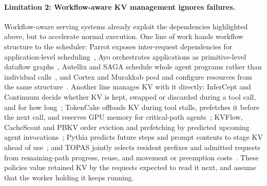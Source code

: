 \paragraph{Limitation 2: Workflow-aware KV management ignores failures.}
Workflow-aware serving systems already exploit the dependencies
highlighted above, but to accelerate normal execution. One line of work
hands workflow structure to the scheduler: Parrot exposes inter-request
dependencies for application-level scheduling~\cite{lin2024parrot}, Ayo
orchestrates applications as primitive-level dataflow
graphs~\cite{tan2025ayo}, Autellix and SAGA schedule whole agent programs
rather than individual calls~\cite{luo2025autellix,guo2026saga}, and
Cortex and Murakkab pool and configure resources from the same
structure~\cite{pagonas2025cortex,chaudhry2026murakkab}. Another line
manages KV with it directly: InferCept and Continuum decide whether KV is
kept, swapped or discarded during a tool call, and for how
long~\cite{abhyankar2024infercept,li2025continuum}; TokenCake offloads KV
during tool stalls, prefetches it before the next call, and reserves GPU
memory for critical-path agents~\cite{bian2025tokencake}; KVFlow,
CacheScout and PBKV order eviction and prefetching by predicted upcoming
agent invocations~\cite{pan2025kvflow,zhang2026cachescout,zheng2026pbkv};
Pythia predicts future steps and prompt contents to stage KV ahead of
use~\cite{yu2026pythia}; and TOPAS jointly selects resident prefixes and
admitted requests from remaining-path progress, reuse, and movement or
preemption costs~\cite{ni2026topas}. These policies value retained KV by
the requests expected to read it next, and assume that the worker holding
it keeps running.

